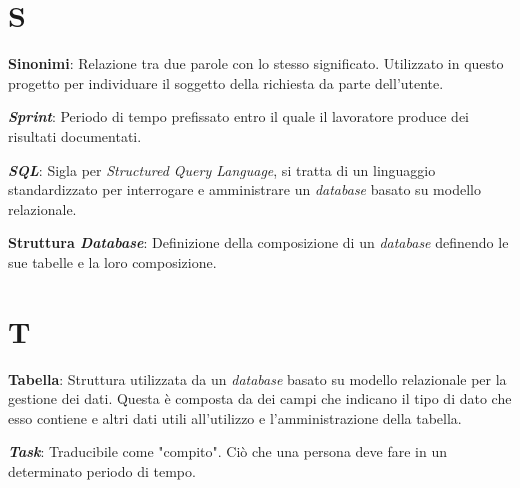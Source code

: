 \documentclass[5pt]{article}
\begin{document}
\section*{S}
\begin{flushleft}

\textbf{Sinonimi}: Relazione tra due parole con lo stesso significato. Utilizzato in questo progetto per individuare il soggetto della richiesta da parte dell'utente.\newline

\textbf{\textit{Sprint}}: Periodo di tempo prefissato entro il quale il lavoratore produce dei risultati documentati.\newline

\textbf{\textit{SQL}}: Sigla per \textit{Structured Query Language}, si tratta di un linguaggio standardizzato per interrogare e amministrare un \textit{database} basato su modello relazionale.\newline

\textbf{Struttura \textit{Database}}: Definizione della composizione di un \textit{database} definendo le sue tabelle e la loro composizione.\newline

\end{flushleft}

\pagebreak

\section*{T}
\begin{flushleft}

\textbf{Tabella}: Struttura utilizzata da un \textit{database} basato su modello relazionale per la gestione dei dati. Questa è composta da dei campi che indicano il tipo di dato che esso contiene e altri dati utili all'utilizzo e l'amministrazione della tabella.\newline

\textbf{\textit{Task}}: Traducibile come "compito". Ciò che una persona deve fare in un determinato periodo di tempo.\newline

\end{flushleft}
\end{document}
